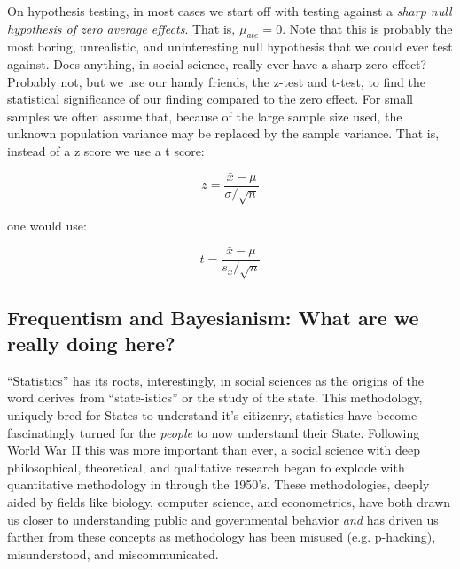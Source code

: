 \documentclass[12pt]{article}\usepackage[]{graphicx}\usepackage[]{color}
\begin{document}
\begin{flushleft}
\newpage

\noindent On hypothesis testing, in most cases we start off with testing against a \textit{sharp null hypothesis of zero average effects}. That is, $\mu_{ate} = 0$. Note that this is probably the most boring, unrealistic, and uninteresting null hypothesis that we could ever test against. Does anything, in social science, really ever have a sharp zero effect? Probably not, but we use our handy friends, the z-test and t-test, to find the statistical significance of our finding compared to the zero effect. For small samples we often assume that, because of the large sample size used, the unknown population variance may be replaced by the sample variance. That is, instead of a z score we use a t score:

\begin{equation}
z= \frac{\bar{x} - \mu}{\sigma / \sqrt{n}}
\end{equation}

\noindent one would use:

\begin{equation}
t = \frac{\bar{x} - \mu}{s_x / \sqrt{n}}
\end{equation}





\subsection{Frequentism and Bayesianism: What are we really doing here?}

``Statistics'' has its roots, interestingly, in social sciences as the origins of the word derives from ``state-istics'' or the study of the state. This methodology, uniquely bred for States to understand it's citizenry, statistics have become fascinatingly turned for the \textit{people} to now understand their State. Following World War II this was more important than ever, a social science with deep philosophical, theoretical, and qualitative research began to explode with quantitative methodology in through the 1950's. These methodologies, deeply aided by fields like biology, computer science, and econometrics, have both drawn us closer to understanding public and governmental behavior \textit{and} has driven us farther from these concepts as methodology has been misused (e.g. p-hacking), misunderstood, and miscommunicated.


\end{flushleft}
\end{document}
